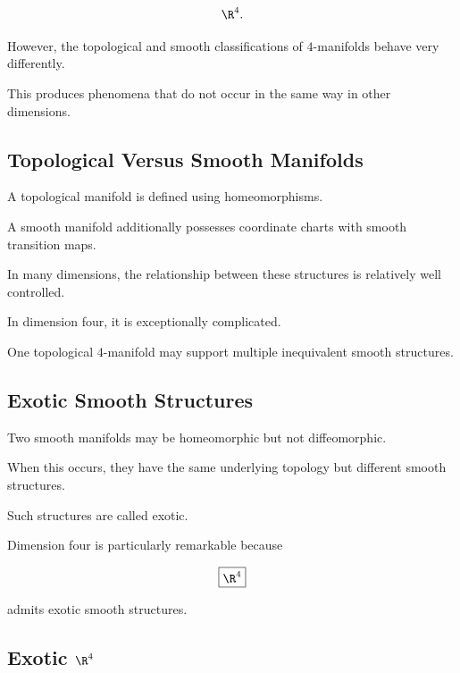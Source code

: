 \[
\R^4.
\]

However, the topological and smooth classifications of \(4\)-manifolds
behave very differently.

This produces phenomena that do not occur in the same way in other
dimensions.

\subsection{Topological Versus Smooth Manifolds}
\label{subsec:topological-versus-smooth-four-manifolds}

A topological manifold is defined using homeomorphisms.

A smooth manifold additionally possesses coordinate charts with smooth
transition maps.

In many dimensions, the relationship between these structures is relatively
well controlled.

In dimension four, it is exceptionally complicated.

One topological \(4\)-manifold may support multiple inequivalent smooth
structures.

\subsection{Exotic Smooth Structures}
\label{subsec:exotic-smooth-structures}

Two smooth manifolds may be homeomorphic but not diffeomorphic.

When this occurs, they have the same underlying topology but different
smooth structures.

Such structures are called exotic.

Dimension four is particularly remarkable because

\[
\boxed{
\R^4
}
\]

admits exotic smooth structures.

\subsection{Exotic \texorpdfstring{\(\R^4\)}{R4}}
\label{subsec:exotic-r4}


